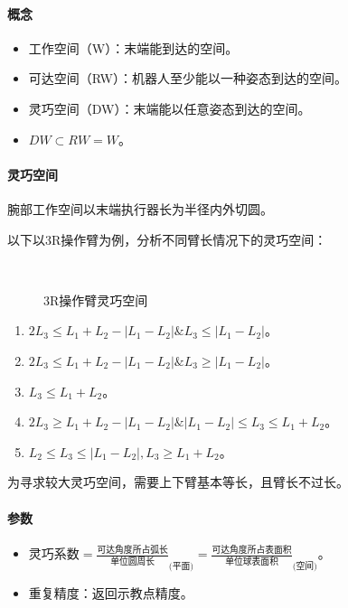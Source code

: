 \documentclass[
12pt, %
a4paper, 
oneside, %
headinclude,footinclude, %
]{scrartcl}
\begin{document}
\paragraph{概念}
\begin{itemize}
\item 工作空间（W）：末端能到达的空间。
\item 可达空间（RW）：机器人至少能以一种姿态到达的空间。
\item 灵巧空间（DW）：末端能以任意姿态到达的空间。
\item $ DW \subset RW = W $。
\end{itemize} 
\paragraph{灵巧空间}
腕部工作空间以末端执行器长为半径内外切圆。

以下以3R操作臂为例，分析不同臂长情况下的灵巧空间：

\begin{figure}[H]
\centering
{} \quad
{} \quad
{} \\
 \quad
{}
\caption[3R操作臂灵巧空间]{3R操作臂灵巧空间}
\end{figure}

{\footnotesize
\begin{enumerate}
\item $ 2L_3 \leq L_1 + L_2 - |L_1 - L_2|\&L_3 \leq |L_1 - L_2| $。
\item $ 2L_3 \leq L_1 + L_2 - |L_1 - L_2|\&L_3 \geq |L_1 - L_2| $。
\item $ L_3 \leq L_1 + L_2 $。
\item $ 2L_3 \geq L_1 + L_2 - |L_1 - L_2|\&|L_1 - L_2| \leq L_3 \leq L_1 + L_2 $。
\item $ L_2 \leq L_3 \leq |L_1 - L_2|, L_3 \geq L_1 + L_2 $。
\end{enumerate}
}

为寻求较大灵巧空间，需要上下臂基本等长，且臂长不过长。
\paragraph{参数}
\begin{itemize}
\item $ \text{灵巧系数} = \frac{\text{可达角度所占弧长}}{\text{单位圆周长}}_{\text{(平面)}} = \frac{\text{可达角度所占表面积}}{\text{单位球表面积}}_{\text{(空间)}} $。
\item 重复精度：返回示教点精度。
\end{itemize} 
\end{document}

